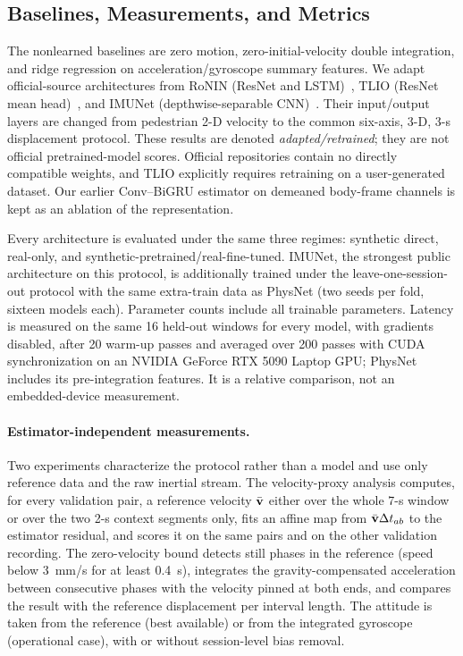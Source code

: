 \subsection{Baselines, Measurements, and Metrics}
The nonlearned baselines are zero motion, zero-initial-velocity double
integration, and ridge regression on acceleration/gyroscope summary features.
We adapt official-source architectures from RoNIN (ResNet and
LSTM)~\cite{yan2020ronin}, TLIO (ResNet mean head)~\cite{liu2020tlio}, and
IMUNet (depthwise-separable CNN)~\cite{zeinali2024imunet}. Their input/output
layers are changed from pedestrian 2-D velocity to the common six-axis, 3-D,
3-s displacement protocol. These results are denoted \emph{adapted/retrained};
they are not official pretrained-model scores. Official repositories contain
no directly compatible weights, and TLIO explicitly requires retraining on a
user-generated dataset. Our earlier Conv--BiGRU estimator on demeaned
body-frame channels is kept as an ablation of the representation.

Every architecture is evaluated under the same three regimes: synthetic
direct, real-only, and synthetic-pretrained/real-fine-tuned. IMUNet, the
strongest public architecture on this protocol, is additionally trained
under the leave-one-session-out protocol with the same extra-train data as
PhysNet (two seeds per fold, sixteen models each).
Parameter counts include all trainable parameters. Latency is measured on the
same 16 held-out windows for every model, with gradients disabled, after 20
warm-up passes and averaged over 200 passes with CUDA synchronization on an
NVIDIA GeForce RTX 5090 Laptop GPU; PhysNet includes its pre-integration
features. It is a relative comparison, not an embedded-device measurement.

\paragraph{Estimator-independent measurements.}
Two experiments characterize the protocol rather than a model and use only
reference data and the raw inertial stream. The velocity-proxy analysis
computes, for every validation pair, a reference velocity $\bar{\bf v}$ either
over the whole 7-s window or over the two 2-s context segments only, fits an
affine map from $\bar{\bf v}\Delta t_{ab}$ to the estimator residual, and scores
it on the same pairs and on the other validation recording. The
zero-velocity bound detects still phases in the reference (speed below
3~mm/s for at least 0.4~s), integrates the gravity-compensated acceleration
between consecutive phases with the velocity pinned at both ends, and
compares the result with the reference displacement per interval length. The
attitude is taken from the reference (best available) or from the integrated
gyroscope (operational case), with or without session-level bias removal.

